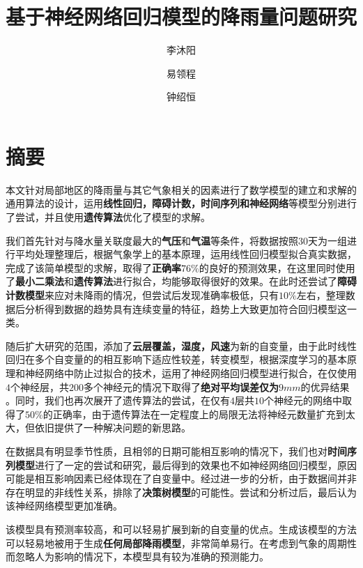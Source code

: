 \documentclass[UTF8, a4paper]{ctexart}
\title{基于神经网络回归模型的降雨量问题研究}
\author{李沐阳 \and 易领程 \and 钟绍恒}
\begin{document}
\maketitle

\newpage

\tableofcontents


\newpage

\section{摘要}

本文针对局部地区的降雨量与其它气象相关的因素进行了数学模型的建立和求解的通用算法的设计，运用\textbf{线性回归，障碍计数，时间序列和神经网络}等模型分别进行了尝试，并且使用\textbf{遗传算法}优化了模型的求解。

我们首先针对与降水量关联度最大的\textbf{气压}和\textbf{气温}等条件，将数据按照$30$天为一组进行平均处理整理后，根据气象学上的基本原理，运用线性回归模型拟合真实数据，完成了该简单模型的求解，取得了\textbf{正确率$76 \%$}的良好的预测效果，在这里同时使用了\textbf{最小二乘法}和\textbf{遗传算法}进行拟合，均能够取得很好的效果。在此时还尝试了\textbf{障碍计数模型}来应对未降雨的情况，但尝试后发现准确率极低，只有$10\%$左右，整理数据后分析得到数据的趋势具有连续变量的特征，趋势上大致更加符合回归模型这一类。

随后扩大研究的范围，添加了\textbf{云层覆盖，湿度，风速}为新的自变量，由于此时线性回归在多个自变量的的相互影响下适应性较差，转变模型，根据深度学习的基本原理和神经网络中防止过拟合的技术，运用了神经网络回归模型进行拟合，在仅使用$4$个神经层，共$200$多个神经元的情况下取得了\textbf{绝对平均误差仅为$9mm$}的优异结果 。同时，我们也再次展开了遗传算法的尝试，在仅有$4$层共$10$个神经元的网络中取得了$50\%$的正确率，由于遗传算法在一定程度上的局限无法将神经元数量扩充到太大，但依旧提供了一种解决问题的新思路。

在数据具有明显季节性质，且相邻的日期可能相互影响的情况下，我们也对\textbf{时间序列模型}进行了一定的尝试和研究，最后得到的效果也不如神经网络回归模型，原因可能是相互影响因素已经体现在了自变量中。经过进一步的分析，由于数据间并非存在明显的非线性关系，排除了\textbf{决策树模型}的可能性。尝试和分析过后，最后认为该神经网络模型更加准确。

该模型具有预测率较高，和可以轻易扩展到新的自变量的优点。生成该模型的方法可以轻易地被用于生成\textbf{任何局部降雨模型}，非常简单易行。在考虑到气象的周期性而忽略人为影响的情况下，本模型具有较为准确的预测能力。
\end{document}
